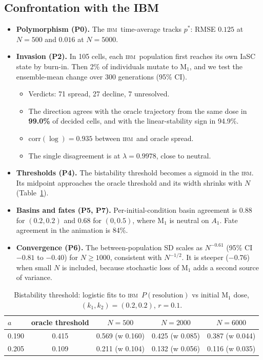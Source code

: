 \documentclass[11pt,a4paper]{article}
\newcommand{\IBM}{\textsc{ibm}}
\newcommand{\pstar}{p^{*}}
\begin{document}
\subsection{Confrontation with the IBM}
\begin{itemize}
\item \textbf{Polymorphism (P0).} The \IBM\ time-average tracks $\pstar$: RMSE $0.125$ at $N=500$ and $0.016$ at $N=5000$.
\item \textbf{Invasion (P2).} In 105 cells, each \IBM\ population first reaches its own IaSC state by burn-in. Then 2\% of individuals mutate to M$_1$, and we test the ensemble-mean change over 300 generations (95\% CI).
  \begin{itemize}
  \item Verdicts: 71 spread, 27 decline, 7 unresolved.
  \item The direction agrees with the oracle trajectory from the same dose in \textbf{99.0\%} of decided cells, and with the linear-stability sign in 94.9\%.
  \item $\mathrm{corr}(\log)=0.935$ between \IBM\ and oracle spread.
  \item The single disagreement is at $\lambda=0.9978$, close to neutral.
  \end{itemize}
\item \textbf{Thresholds (P4).} The bistability threshold becomes a sigmoid in the \IBM. Its midpoint approaches the oracle threshold and its width shrinks with $N$ (Table~\ref{tab:thr}).
\item \textbf{Basins and fates (P5, P7).} Per-initial-condition basin agreement is 0.88 for $(0.2,0.2)$ and 0.68 for $(0,0.5)$, where M$_1$ is neutral on $A_1$. Fate agreement in the animation is 84\%.
\item \textbf{Convergence (P6).} The between-population SD scales as $N^{-0.61}$ (95\% CI $-0.81$ to $-0.40$) for $N\ge1000$, consistent with $N^{-1/2}$. It is steeper ($-0.76$) when small $N$ is included, because stochastic loss of M$_1$ adds a second source of variance.
\end{itemize}
\begin{table}[H]\centering\caption{Bistability threshold: logistic fits to \IBM\ $P(\text{resolution})$ vs initial M$_1$ dose, $(k_1,k_2)=(0.2,0.2)$, $r=0.1$.}\label{tab:thr}
\begin{tabular}{lcccc}\toprule
$a$ & oracle threshold & $N=500$ & $N=2000$ & $N=6000$\\\midrule
0.190 & 0.415 & 0.569 (w 0.160) & 0.425 (w 0.085) & 0.387 (w 0.044)\\
0.205 & 0.109 & 0.211 (w 0.104) & 0.132 (w 0.056) & 0.116 (w 0.035)\\\bottomrule\end{tabular}\end{table}
\end{document}
